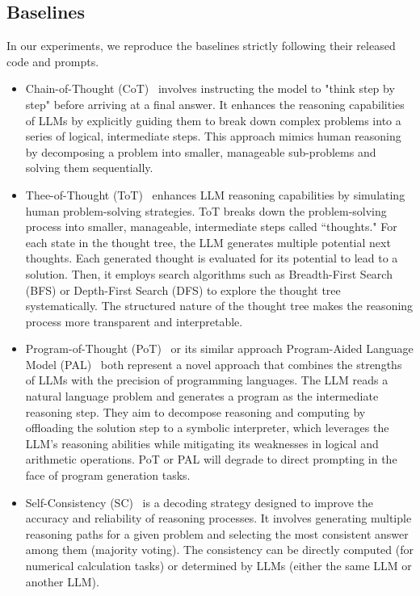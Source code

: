 \subsection{Baselines}\label{app:baselines}
In our experiments, we reproduce the baselines strictly following their released code and prompts.
\begin{itemize}
    \item Chain-of-Thought (CoT)~\cite{CoT} involves instructing the model to "think step by step" before arriving at a final answer. It enhances the reasoning capabilities of LLMs by explicitly guiding them to break down complex problems into a series of logical, intermediate steps. This approach mimics human reasoning by decomposing a problem into smaller, manageable sub-problems and solving them sequentially.

    \item Thee-of-Thought (ToT)~\cite{ToT} enhances LLM reasoning capabilities by simulating human problem-solving strategies. ToT breaks down the problem-solving process into smaller, manageable, intermediate steps called ``thoughts." For each state in the thought tree, the LLM generates multiple potential next thoughts. Each generated thought is evaluated for its potential to lead to a solution. Then, it employs search algorithms such as Breadth-First Search (BFS) or Depth-First Search (DFS) to explore the thought tree systematically. The structured nature of the thought tree makes the reasoning process more transparent and interpretable.

    \item Program-of-Thought (PoT)~\cite{PoT} or its similar approach Program-Aided Language Model (PAL)~\cite{PAL} both represent a novel approach that combines the strengths of LLMs with the precision of programming languages. The LLM reads a natural language problem and generates a program as the intermediate reasoning step. They aim to decompose reasoning and computing by offloading the solution step to a symbolic interpreter, which leverages the LLM's reasoning abilities while mitigating its weaknesses in logical and arithmetic operations.
    PoT or PAL will degrade to direct prompting in the face of program generation tasks.

    \item Self-Consistency (SC)~\cite{Self-Consistency} is a decoding strategy designed to improve the accuracy and reliability of reasoning processes. It involves generating multiple reasoning paths for a given problem and selecting the most consistent answer among them (majority voting). The consistency can be directly computed (for numerical calculation tasks) or determined by LLMs (either the same LLM or another LLM).


\end{itemize}
